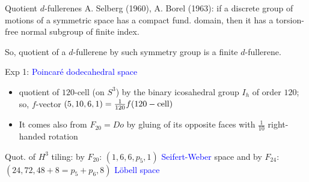 \documentclass[%
pdf,
colorBG,
slideColor,
]{prosper}
\begin{document}
%
%
%
%






\begin{slide}{Quotient $d$-fullerenes}
A. Selberg (1960), A. Borel (1963): if a discrete group of motions of
a symmetric space has a compact fund. domain, then it has a torsion-free
normal subgroup of finite index.

So, quotient of a $d$-fullerene by such symmetry group is a finite 
$d$-fullerene.

Exp 1: \textcolor{blue}{Poincar\'e dodecahedral space}
\begin{itemize}
\item quotient of $120$-cell (on $S^3$) by the binary icosahedral group
$I_h$ of order $120$; so, $f$-vector $(5,10, 6, 1)=\frac{1}{120}f(120-{\rm cell})$
\item It comes also from $F_{20}=Do$ by gluing of its opposite faces with $\frac{1}{10}$ right-handed rotation
\end{itemize}

Quot. of $H^3$ tiling:
by $F_{20}$: $(1,6,6,p_5, 1)$ \textcolor{blue}{Seifert-Weber} space
and by $F_{24}$: $(24, 72, 48+8=p_5+p_6, 8)$ \textcolor{blue}{L\"obell space}



\end{slide}
\end{document}

